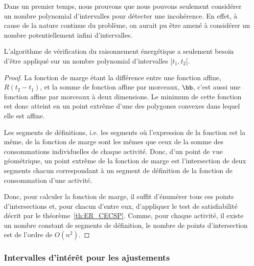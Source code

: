 Dans un premier temps, nous prouvons que nous pouvons seulement
considérer un nombre polynomial d'intervalles pour détecter une
incohérence. En effet, à cause de la nature continue du problème, on
aurait pu être amené à considérer un nombre potentiellement infini
d'intervalles. 

\begin{theo}
L'algorithme de vérification du raisonnement énergétique a seulement
besoin d'être appliqué sur un nombre polynomial d'intervalles $[t_1,t_2[$.
\end{theo}

\begin{proof}
La fonction de marge étant la différence entre une fonction affine,
$R(t_2-t_1)$, et la somme de fonction affine par morceaux,
$\bb$, c'est aussi une fonction affine par morceaux à deux
dimensions. Le minimum de cette fonction est donc atteint en un point
extrême d'une des polygones convexes dans lequel elle est
affine. 

Les segments de définitions, i.e. les segments où l'expression de la
fonction est la même, de la fonction de marge sont les mêmes que ceux
de la somme des consommations individuelles de chaque activité. Donc,
d'un point de vue géométrique, un point extrême de la fonction de marge
est l'intersection de deux segments chacun correspondant à un segment
de définition de la fonction de consommation d'une activité. 

Donc, pour calculer la fonction de marge, il suffit d'énumérer tous
ces points d'intersections et, pour chacun d'entre eux, d'appliquer le
test de satisfiabilité décrit par le
théorème~\ref{th:ER_CECSP}. Comme, pour chaque activité, il existe un
nombre constant de segments de définition, le nombre de points
d'intersection est de l'ordre de $O(n^2)$. 
\end{proof}


\subsubsection{Intervalles d'intérêt pour les ajustements}

